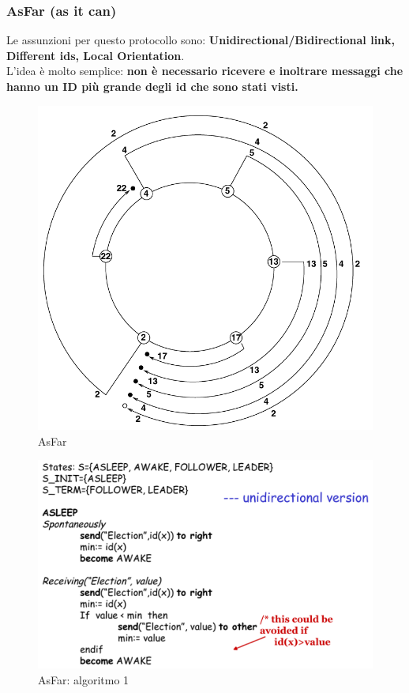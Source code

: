 \documentclass[12pt]{article}
\begin{document}
		\subsubsection{AsFar (as it can)}
			Le assunzioni per questo protocollo sono: \textbf{Unidirectional/Bidirectional link, Different ids, Local Orientation}.\\
			L'idea è molto semplice: \textbf{non è necessario ricevere e inoltrare messaggi che hanno un ID più grande degli id che sono stati visti.}
			\begin{figure}[h!]
				\centering
				\includegraphics[scale=0.30]{img/asfar.png}
				\caption{AsFar}
			\end{figure}
			\begin{figure}[h!]
				\centering
				\includegraphics[scale=0.30]{img/asfar3.png}
				\caption{AsFar: algoritmo 1}
			\end{figure}
\end{document}
